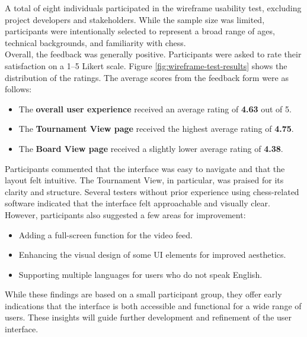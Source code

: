 A total of eight individuals participated in the wireframe usability test, excluding project developers and stakeholders. While the sample size was limited, participants were intentionally selected to represent a broad range of ages, technical backgrounds, and familiarity with chess. \\

Overall, the feedback was generally positive. Participants were asked to rate their satisfaction on a 1–5 Likert scale. Figure \ref{fig:wireframe-test-results} shows the distribution of the ratings. The average scores from the feedback form were as follows:

\begin{itemize}
    \item The \textbf{overall user experience} received an average rating of \textbf{4.63} out of 5.
    \item The \textbf{Tournament View page} received the highest average rating of \textbf{4.75}.
    \item The \textbf{Board View page} received a slightly lower average rating of \textbf{4.38}.
\end{itemize}

Participants commented that the interface was easy to navigate and that the layout felt intuitive. The Tournament View, in particular, was praised for its clarity and structure. Several testers without prior experience using chess-related software indicated that the interface felt approachable and visually clear. \\

However, participants also suggested a few areas for improvement:

\begin{itemize}
    \item Adding a full-screen function for the video feed.
    \item Enhancing the visual design of some UI elements for improved aesthetics.
    \item Supporting multiple languages for users who do not speak English.
\end{itemize}

While these findings are based on a small participant group, they offer early indications that the interface is both accessible and functional for a wide range of users. These insights will guide further development and refinement of the user interface.

